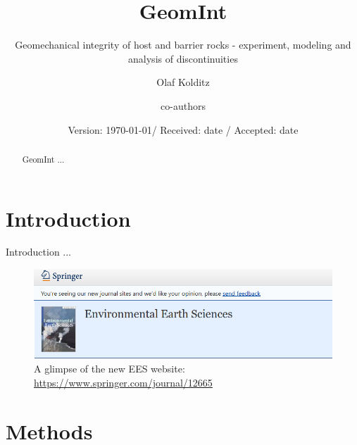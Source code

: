 \documentclass{svjour3}                     %
\begin{document}
\title{GeomInt}
\subtitle{Geomechanical integrity of host and barrier rocks - experiment, modeling and analysis of discontinuities}
\author{Olaf Kolditz \and co-authors}
\date{Version: \today / Received: date / Accepted: date}
\maketitle
\begin{abstract}
GeomInt ...

\end{abstract}
\section{Introduction}
\label{sec:intro}

Introduction ...

\begin{figure}[ht!]
\centering
\includegraphics[width=1.00\columnwidth]{fig01a.png}
\caption{A glimpse of the new EES website: \url{https://www.springer.com/journal/12665}}
\label{fig:01}
\end{figure}

\section{Methods}
\label{sec:methods}
\end{document}
